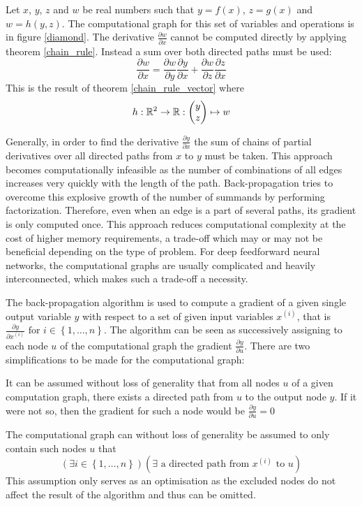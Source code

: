 \begin{example}
	Let \( x \), \( y \), \( z \) and \( w \) be real numbers such that \( y = f \left( x \right) \), \( z = g \left( x \right) \) and \( w = h \left( y, z \right) \). The computational graph for this set of variables and operations is in figure \ref{diamond}. The derivative \( \frac{\partial w}{\partial x} \) cannot be computed directly by applying theorem \ref{chain_rule}. Instead a sum over both directed paths must be used:
	\[ \frac{\partial w}{\partial x} = \frac{\partial w}{\partial y} \frac{\partial y}{\partial x} + \frac{\partial w}{\partial z} \frac{\partial z}{\partial x} \]
	This is the result of theorem \ref{chain_rule_vector} where 
	\[ h : \mathbb R^2 \to \mathbb R : 
	\begin{pmatrix}
		y \\
		z
	\end{pmatrix} \mapsto w \]

Generally, in order to find the derivative \( \frac{\partial y}{\partial x} \) the sum of chains of partial derivatives over all directed paths from \( x \) to \( y \) must be taken. This approach becomes computationally infeasible as the number of combinations of all edges increases very quickly with the length of the path. Back-propagation tries to overcome this explosive growth of the number of summands by performing factorization. Therefore, even when an edge is a part of several paths, its gradient is only computed once. This approach reduces computational complexity at the cost of higher memory requirements, a trade-off which may or may not be beneficial depending on the type of problem. For deep feedforward neural networks, the computational graphs are usually complicated and heavily interconnected, which makes such a trade-off a necessity.

The back-propagation algorithm is used to compute a gradient of a given single output variable \( y \) with respect to a set of given input variables \( x^{(i)} \), that is \( \frac{\partial y}{\partial x^{(i)}} \text{ for } i \in \left\{ 1, \dots, n \right\} \). The algorithm can be seen as successively assigning to each node \( u \) of the computational graph the gradient \( \frac{\partial y }{\partial u} \). There are two simplifications to be made for the computational graph:

\begin{remark}\label{backprop-no-dead-ends}
	It can be assumed without loss of generality that from all nodes \( u \) of a given computation graph, there exists a directed path from \( u \) to the output node \( y \). If it were not so, then the gradient for such a node would be \( \frac{\partial y}{\partial u} = 0 \)
\end{remark}
\begin{remark}
	The computational graph can without loss of generality be assumed to only contain such nodes \( u \) that
	\[ \left( \exists i \in \left\{ 1, \dots, n \right\} \right) \left( \exists \text{ a directed path from } x^{(i)} \text{ to } u \right) \]
	This assumption only serves as an optimisation as the excluded nodes do not affect the result of the algorithm and thus can be omitted.
\end{remark}


\end{example}
